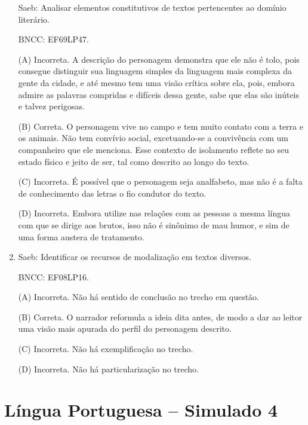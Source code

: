 \begin{enumerate}
Saeb: Analisar elementos constitutivos de textos pertencentes ao domínio
literário.

BNCC: EF69LP47.

(A) Incorreta. A descrição do personagem demonstra que ele não é tolo,
pois consegue distinguir sua linguagem simples da linguagem mais
complexa da gente da cidade, e até mesmo tem uma visão crítica sobre
ela, pois, embora admire as palavras compridas e difíceis dessa gente,
sabe que elas são inúteis e talvez perigosas.

(B) Correta. O personagem vive no campo e tem muito contato com a terra
e os animais. Não tem convívio social, excetuando-se a convivência com
um companheiro que ele menciona. Esse contexto de isolamento reflete no seu estado físico e jeito de ser, tal como descrito ao longo do texto.

(C) Incorreta. É possível que o personagem seja analfabeto, mas não é a
falta de conhecimento das letras o fio condutor do texto.

(D) Incorreta. Embora utilize nas relações com as pessoas a mesma língua
com que se dirige aos brutos, isso não é sinônimo de mau humor, e sim de
uma forma austera de tratamento.

\item

Saeb: Identificar os recursos de modalização em textos diversos.

BNCC: EF08LP16.

(A) Incorreta. Não há sentido de conclusão no trecho em questão.

(B) Correta. O narrador reformula a ideia dita antes, de modo a dar ao
leitor uma visão mais apurada do perfil do personagem descrito.

(C) Incorreta. Não há exemplificação no trecho.

(D) Incorreta. Não há particularização no trecho.

\end{enumerate}

\section*{Língua Portuguesa – Simulado 4}

